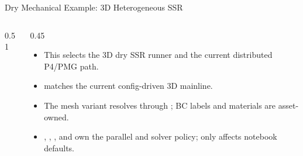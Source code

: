 \documentclass[aspectratio=169,10pt]{beamer}
\begin{document}
\begin{frame}{Dry Mechanical Example: 3D Heterogeneous SSR}
\small
\begin{columns}[T,totalwidth=\textwidth]
\begin{column}{0.51\textwidth}
\begin{pseudobox}
\code{[problem]}\\
\\
\\
\\
\\[0.10cm]
\code{[execution]}\\
\\[0.10cm]
\code{[continuation]}\\
\\
\\[0.10cm]
\code{[newton]}\\
\\
\\[0.10cm]
\\
\end{pseudobox}
\end{column}
\begin{column}{0.45\textwidth}
\begin{softbox}
\begin{itemize}
  \item This selects the 3D dry SSR runner and the current distributed P4/PMG path.
  \item {} matches the current config-driven 3D mainline.
  \item The mesh variant resolves through ; BC labels and materials are asset-owned.
  \item \code{[execution]}, \code{[continuation]}, \code{[newton]}, and  own the parallel and solver policy; \code{[notebook]} only affects notebook defaults.
\end{itemize}
\end{softbox}
\end{column}
\end{columns}
\end{frame}
\end{document}
